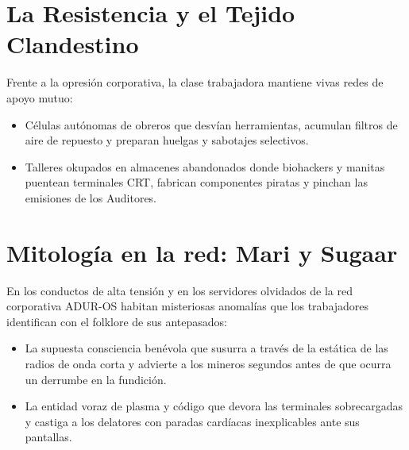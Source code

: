 
\section{La Resistencia y el Tejido Clandestino}

Frente a la opresión corporativa, la clase trabajadora mantiene vivas redes de apoyo mutuo:
\begin{itemize}
  \item {} Células autónomas de obreros que desvían herramientas, acumulan filtros de aire de repuesto y preparan huelgas y sabotajes selectivos.
  \item {} Talleres okupados en almacenes abandonados donde biohackers y manitas puentean terminales CRT, fabrican componentes piratas y pinchan las emisiones de los Auditores.
\end{itemize}

\section{Mitología en la red: Mari y Sugaar}


En los conductos de alta tensión y en los servidores olvidados de la red corporativa ADUR-OS habitan misteriosas anomalías que los trabajadores identifican con el folklore de sus antepasados:
\begin{itemize}
  \item {} La supuesta consciencia benévola que susurra a través de la estática de las radios de onda corta y advierte a los mineros segundos antes de que ocurra un derrumbe en la fundición.
  \item {} La entidad voraz de plasma y código que devora las terminales sobrecargadas y castiga a los delatores con paradas cardíacas inexplicables ante sus pantallas.
\end{itemize}
